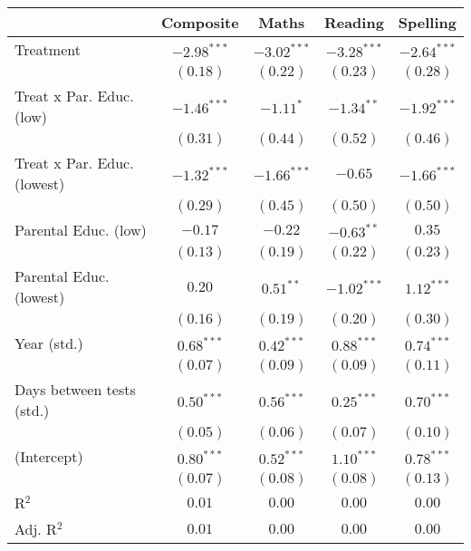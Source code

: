 
\begin{table}
\begin{center}
\begin{tabular}{l c c c c}
\hline
 & Composite & Maths & Reading & Spelling \\
\hline
Treatment                   & $-2.98^{***}$ & $-3.02^{***}$ & $-3.28^{***}$ & $-2.64^{***}$ \\
                            & $(0.18)$      & $(0.22)$      & $(0.23)$      & $(0.28)$      \\
Treat x Par. Educ. (low)    & $-1.46^{***}$ & $-1.11^{*}$   & $-1.34^{**}$  & $-1.92^{***}$ \\
                            & $(0.31)$      & $(0.44)$      & $(0.52)$      & $(0.46)$      \\
Treat x Par. Educ. (lowest) & $-1.32^{***}$ & $-1.66^{***}$ & $-0.65$       & $-1.66^{***}$ \\
                            & $(0.29)$      & $(0.45)$      & $(0.50)$      & $(0.50)$      \\
Parental Educ. (low)        & $-0.17$       & $-0.22$       & $-0.63^{**}$  & $0.35$        \\
                            & $(0.13)$      & $(0.19)$      & $(0.22)$      & $(0.23)$      \\
Parental Educ. (lowest)     & $0.20$        & $0.51^{**}$   & $-1.02^{***}$ & $1.12^{***}$  \\
                            & $(0.16)$      & $(0.19)$      & $(0.20)$      & $(0.30)$      \\
Year (std.)                 & $0.68^{***}$  & $0.42^{***}$  & $0.88^{***}$  & $0.74^{***}$  \\
                            & $(0.07)$      & $(0.09)$      & $(0.09)$      & $(0.11)$      \\
Days between tests (std.)   & $0.50^{***}$  & $0.56^{***}$  & $0.25^{***}$  & $0.70^{***}$  \\
                            & $(0.05)$      & $(0.06)$      & $(0.07)$      & $(0.10)$      \\
(Intercept)                 & $0.80^{***}$  & $0.52^{***}$  & $1.10^{***}$  & $0.78^{***}$  \\
                            & $(0.07)$      & $(0.08)$      & $(0.08)$      & $(0.13)$      \\
\hline
R$^2$                       & $0.01$        & $0.00$        & $0.00$        & $0.00$        \\
Adj. R$^2$                  & $0.01$        & $0.00$        & $0.00$        & $0.00$        \\

\end{tabular}
\end{center}
\end{table}
